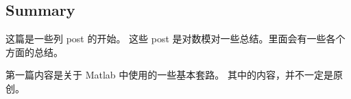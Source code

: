 
\subsection{Summary}
\label{ssec:summary}
这篇是一些列 post 的开始。
这些 post 是对数模对一些总结。里面会有一些各个方面的总结。

第一篇内容是关于 Matlab 中使用的一些基本套路。
其中的内容，并不一定是原创。
\endinput

